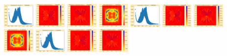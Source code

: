 \documentclass[11pt]{article}
\begin{document}
\includegraphics[width=0.11875\textwidth]{frame0079fig1.png}
\includegraphics[width=0.11875\textwidth]{frame0079fig2.png}
\includegraphics[width=0.11875\textwidth]{frame0079fig3.png}
\vskip 10pt 
\includegraphics[width=0.11875\textwidth]{frame0080fig0.png}
\includegraphics[width=0.11875\textwidth]{frame0080fig1.png}
\includegraphics[width=0.11875\textwidth]{frame0080fig2.png}
\includegraphics[width=0.11875\textwidth]{frame0080fig3.png}
\includegraphics[width=0.11875\textwidth]{frame0081fig0.png}
\includegraphics[width=0.11875\textwidth]{frame0081fig1.png}
\includegraphics[width=0.11875\textwidth]{frame0081fig2.png}
\includegraphics[width=0.11875\textwidth]{frame0081fig3.png}
\end{document}
